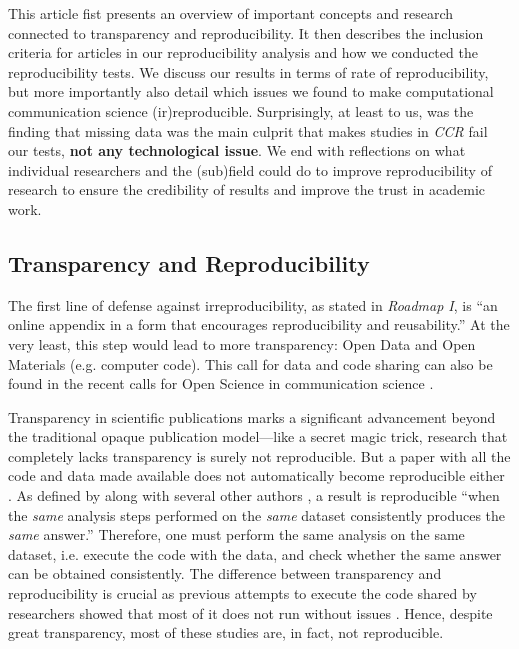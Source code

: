 This article fist presents an overview of important concepts and research connected to transparency and reproducibility.
It then describes the inclusion criteria for articles in our reproducibility analysis and how we conducted the reproducibility tests.
We discuss our results in terms of rate of reproducibility, but more importantly also detail which issues we found to make computational communication science (ir)reproducible.
Surprisingly, at least to us, was the finding that missing data was the main culprit that makes studies in \textit{CCR} fail our tests, \textbf{not any technological issue}.
We end with reflections on what individual researchers and the (sub)field could do to improve reproducibility of research to ensure the credibility of results and improve the trust in academic work.

\subsection{Transparency and Reproducibility}

The first line of defense against irreproducibility, as stated in \textit{Roadmap I}, is ``an online appendix in a form that encourages reproducibility and reusability.'' At the very least, this step would lead to more transparency: Open Data and Open Materials (e.g. computer code). This call for data and code sharing can also be found in the recent calls for Open Science in communication science \parencite[]{dienlin:2020:AOS,bowman:2020:CBP,lewis:2019:OCS}.

Transparency in scientific publications marks a significant advancement beyond the traditional opaque publication model---like a secret magic trick, research that completely lacks transparency is surely not reproducible. But a paper with all the code and data made available does not automatically become reproducible either \parencite[]{peng:2011:RRC}. As defined by \textcite{The_Turing_Way:2022} along with several other authors \parencite[i.e.,][]{schoch:2023:CRC,broman2017recommendations}, a result is reproducible ``when the
\textit{same} analysis steps performed on the \textit{same} dataset consistently produces the \textit{same} answer.''
Therefore, one must perform the same analysis on the same dataset, i.e. execute the code with the data, and check whether the same answer can be obtained consistently.
The difference between transparency and reproducibility is crucial as previous attempts to execute the code shared by researchers showed that most of it does not run without issues \parencite[]{cruewell:2023:WB,trisovic:2022}.
Hence, despite great transparency, most of these studies are, in fact, not reproducible.

